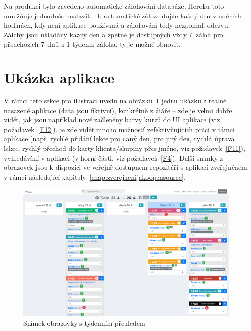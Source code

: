 Na produkci bylo zavedeno automatické zálohování databáze, Heroku toto umožňuje jednoduše nastavit \cite{heroku-backups} -- k automatické záloze dojde každý den v nočních hodinách, kdy není aplikace používaná a zálohování tedy nezpomalí odezvu. Zálohy jsou ukládány každý den a zpětně je dostupných vždy 7~záloh pro předchozích 7~dnů a 1 týdenní záloha, ty je možné obnovit.

\section{Ukázka aplikace}

V rámci této sekce pro ilustraci uvedu na obrázku~\ref{fig:screen-tyden} jednu ukázku z reálně nasazené aplikace (data jsou fiktivní), konkrétně z diáře -- zde je velmi dobře vidět, jak jsou například nově začleněny barvy kurzů do UI aplikace (viz požadavek~\ref{F12}), je zde vidět mnoho možností zefektivňujících práci v rámci aplikace (např. rychlé přidání lekce pro daný den, pro jiný den, rychlá úprava lekce, rychlý přechod do karty klienta/skupiny přes jméno, viz požadavek~\ref{F11}), vyhledávání v aplikaci (v horní části, viz požadavek~\ref{F4}). Další snímky z obrazovek jsou k dispozici ve veřejně dostupném repozitáři s aplikací zveřejněném v rámci následující kapitoly~\ref{chap:zverejnenijakoopensource}.

\begin{landscape}
    \begin{figure}\centering
    	\includegraphics[totalheight=0.92\textheight]{img/diary.png}
    	\caption{Snímek obrazovky s týdenním přehledem}\label{fig:screen-tyden}
    \end{figure}
\end{landscape}

